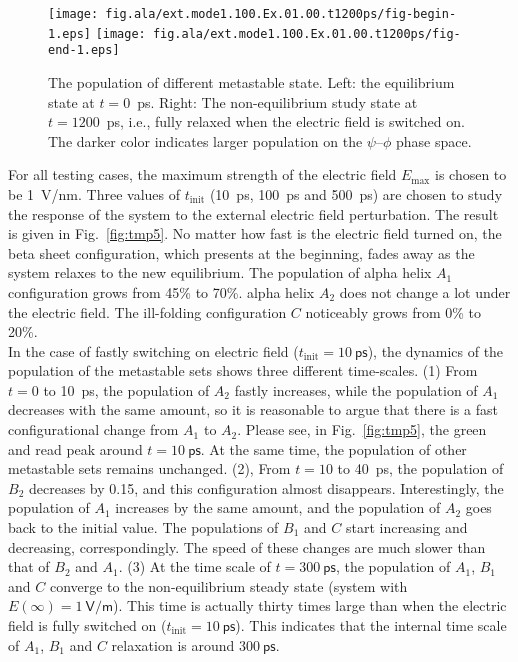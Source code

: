 \documentclass[a4paper,preprint,onecolumn]{revtex4-1}
\begin{document}
\begin{figure}
  \centering
  \texttt{[image: fig.ala/ext.mode1.100.Ex.01.00.t1200ps/fig-begin-1.eps]}
  \texttt{[image: fig.ala/ext.mode1.100.Ex.01.00.t1200ps/fig-end-1.eps]}
  \caption{The population of different metastable state. Left: the equilibrium state at $t=0$~\textsf{ps}. Right: The non-equilibrium study state at $t=1200$~\textsf{ps}, i.e., fully relaxed when the electric field is switched on. The darker color indicates larger population on the $\psi$--$\phi$ phase space.}
  \label{fig:tmp4}
\end{figure}


For all testing cases, the maximum strength of the electric field
$E_{\textrm{max}}$ is chosen to be 1~\textsf{V/nm}.  Three values of
$t_{\textrm{init}}$ (10~\textsf{ps}, 100~\textsf{ps} and
500~\textsf{ps}) are chosen to study the response of the system to the
external electric field perturbation. The result is given in
Fig.~\ref{fig:tmp5}.  No matter how fast is the electric field turned
on, the beta sheet configuration, which presents at the beginning,
fades away as the system relaxes to the new equilibrium. The
population of alpha helix $A_1$ configuration grows from 45\% to 70\%.
alpha helix $A_2$  does not change a lot under the electric field.
The ill-folding configuration $C$ noticeably grows from 0\% to 20\%.
\\

In the case of fastly switching on electric field
($t_{\textrm{init}}=10~\textsf{ps}$), the dynamics of the population
of the metastable sets shows three different time-scales. (1) From
$t=0$ to 10~\textsf{ps}, the population of $A_2$ fastly increases,
while the population of $A_1$ decreases with the same amount, so it is
reasonable to argue that there is a fast configurational change from
$A_1$ to $A_2$. Please see, in Fig.~\ref{fig:tmp5}, the green and read
peak around $t = 10~\textsf{ps}$. At the same time, the population of
other metastable sets remains unchanged.  (2), From $t=10$ to
40~\textsf{ps}, the population of $B_2$ decreases by 0.15, and this
configuration almost disappears. Interestingly, the population of $A_1$
increases by the same amount, and the population of $A_2$ goes back to
the initial value. The populations of $B_1$ and $C$ start increasing
and decreasing, correspondingly. The speed of these changes are much
slower than that of $B_2$ and $A_1$.  (3) At the time scale of $t =
300~\textsf{ps}$, the population of $A_1$, $B_1$ and $C$ converge to
the non-equilibrium steady state (system with $E(\infty) = 1~\textsf{V/m}$).
This time is actually thirty times large than when the electric field
is fully switched on ($t_{\textrm{init}} = 10~\textsf{ps}$). This 
indicates that the internal time scale of $A_1$, $B_1$ and $C$
relaxation is around $300~\textsf{ps}$.\\
\end{document}
